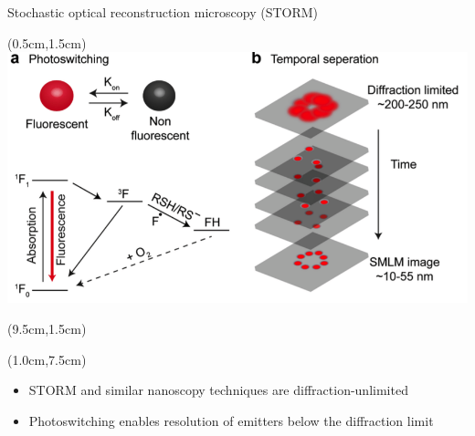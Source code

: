 \documentclass{beamer}					%
\begin{document}
\begin{frame}{Stochastic optical reconstruction microscopy (STORM)}
\begin{textblock*}{9cm}(0.5cm,1.5cm)
\includegraphics[width=\textwidth]{media/Intro.png}
\end{textblock*}
\begin{textblock*}{5cm}(9.5cm,1.5cm)
\end{textblock*}
\begin{textblock*}{\textwidth}(1.0cm,7.5cm)
\begin{itemize}
\item STORM and similar nanoscopy techniques are diffraction-unlimited
\item Photoswitching enables resolution of emitters below the diffraction limit
\end{itemize}
\end{textblock*}
\end{frame}
\end{document}
